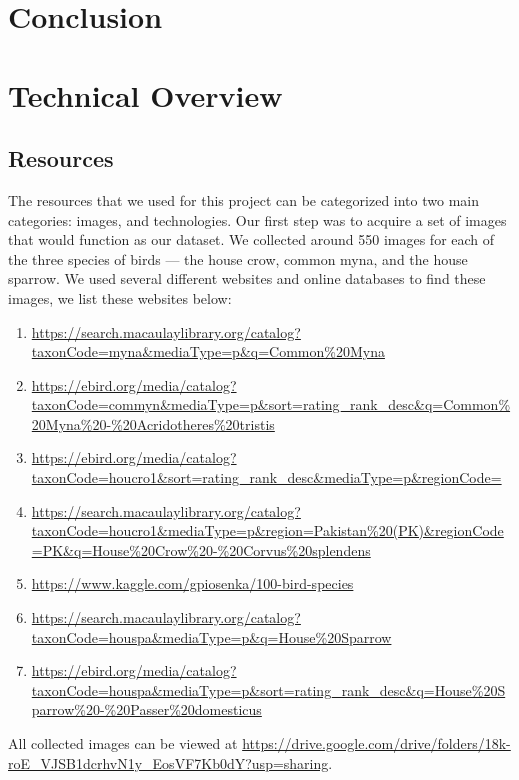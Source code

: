 \documentclass{article}
\begin{document}
\section{Conclusion}
\newpage

\section{Technical Overview}
\subsection{Resources}
  The resources that we used for this project can be categorized into two main 
  categories: images, and technologies. Our first step was to acquire a set of images that would 
  function as our dataset. We collected around 550 images for each of the three 
  species of birds --- the house crow, common myna, and the house sparrow. We used 
  several different websites and online databases to find these images, we list 
  these websites below: 
  \begin{enumerate}
    \item \url{https://search.macaulaylibrary.org/catalog?taxonCode=myna&mediaType=p&q=Common\%20Myna}
    \item \url{https://ebird.org/media/catalog?taxonCode=commyn&mediaType=p&sort=rating_rank_desc&q=Common\%20Myna\%20-\%20Acridotheres\%20tristis}
    \item \url{https://ebird.org/media/catalog?taxonCode=houcro1&sort=rating_rank_desc&mediaType=p&regionCode=}
    \item \url{https://search.macaulaylibrary.org/catalog?taxonCode=houcro1&mediaType=p&region=Pakistan\%20(PK)&regionCode=PK&q=House\%20Crow\%20-\%20Corvus\%20splendens}
    \item \url{https://www.kaggle.com/gpiosenka/100-bird-species}
    \item \url{https://search.macaulaylibrary.org/catalog?taxonCode=houspa&mediaType=p&q=House\%20Sparrow}
    \item \url{https://ebird.org/media/catalog?taxonCode=houspa&mediaType=p&sort=rating_rank_desc&q=House\%20Sparrow\%20-\%20Passer\%20domesticus}
    \label{imagelinks}
  \end{enumerate}
  \setlength{\parskip}{1em}
  All collected images can be viewed at \url{https://drive.google.com/drive/folders/18k-roE_VJSB1dcrhvN1y_EosVF7Kb0dY?usp=sharing}.
\end{document}
